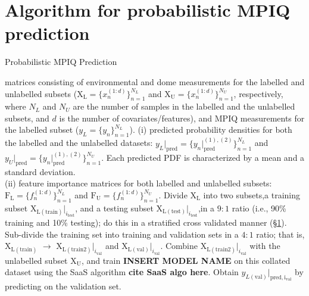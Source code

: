 \section{Algorithm for probabilistic MPIQ prediction}
\label{sec:DL_putting_it_all_together}

\begin{algorithm}
\caption{Probabilistic MPIQ Prediction}
\label{algo:cont_norm}
\begin{algorithmic}[1]
\renewcommand{\algorithmicrequire}{\textbf{Input:}}
\renewcommand{\algorithmicensure}{\textbf{Output:}}
\REQUIRE matrices consisting of environmental and dome measurements for the labelled and unlabelled subsets ($\boldsymbol{\mathrm{X_{L}}} = \{x_{n}^{(1:d)}\}^{N_L}_{n=1}$ and $\boldsymbol{\mathrm{X_{U}}} = \{x_{n}^{(1:d)}\}^{N_U}_{n=1}$, respectively, where $N_L$ and $N_U$ are the number of samples in the labelled and the unlabelled subsets, and $d$ is the number of covariates/features), and MPIQ measurements for the labelled subset ($y_L = \{y_{n}\}^{N_L}_{n=1}$).
\ENSURE (i) predicted probability densities for both the labelled and the unlabelled datasets: $y_{L}\vert_\mathrm{pred} =\{y_{n}\vert_\mathrm{pred}^{(1),(2)}\}^{N_L}_{n=1}$ and $y_{U}\vert_\mathrm{pred} =\{y_{n}\vert_\mathrm{pred}^{(1),(2)}\}^{N_U}_{n=1}$. Each predicted PDF is characterized by a mean and a standard deviation. \\
(ii) feature importance matrices for both labelled and unlabelled subsets: $\boldsymbol{\mathrm{F_{L}}} = \{f_{n}^{(1:d)}\}^{N_L}_{n=1}$ and $\boldsymbol{\mathrm{F_{U}}} = \{f_{n}^{(1:d)}\}^{N_U}_{n=1}$.
\STATE Divide $\boldsymbol{\mathrm{X_{L}}}$ into two subsets,a training subset $\boldsymbol{\mathrm{X_{L(train)}}}\vert_{i_\mathrm{test}}$, and a testing subset $\boldsymbol{\mathrm{X_{L(test)}}}\vert_{i_\mathrm{test}}$,in a $9:1$ ratio (i.e., 90\% training and 10\% testing); do this in a stratified cross validated manner (\S\ref{sec:DL_putting_it_all_together}).
\STATE Sub-divide the training set into training and validation sets in a $4:1$ ratio; that is, $\boldsymbol{\mathrm{X_{L(train)}}}$ $\rightarrow$ $\boldsymbol{\mathrm{X_{L(train2)}}}\vert_{i_\mathrm{val}}$ and $\boldsymbol{\mathrm{X_{L(val)}}}\vert_{i_\mathrm{val}}$.
\STATE Combine $\boldsymbol{\mathrm{X_{L(train2)}}}\vert_{i_\mathrm{val}}$ with the unlabelled subset $\boldsymbol{\mathrm{X_{U}}}$, and train \textbf{INSERT MODEL NAME} on this collated dataset using the SaaS algorithm \textbf{cite SaaS algo here}. Obtain $y_{L(\mathrm{val})}\vert_\mathrm{pred, i_\mathrm{val}}$ by predicting on the validation set.

\end{algorithmic}
\end{algorithm}
